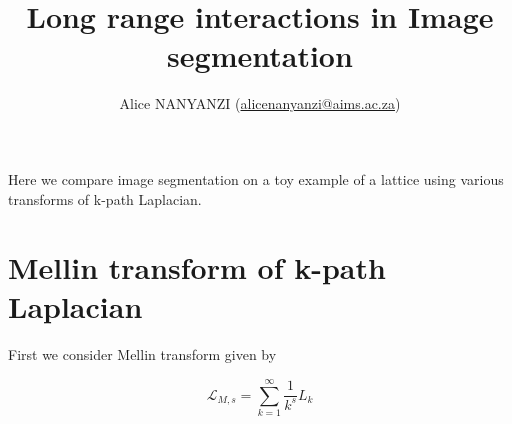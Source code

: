 \documentclass[10pt,a4paper]{article}
\author{Alice NANYANZI (\href{mailto:alicenanyanzi@aims.ac.za}{alicenanyanzi@aims.ac.za})}
\title{Long range interactions in Image segmentation}
\begin{document}
\maketitle
Here we compare image segmentation on a toy example of a lattice using various transforms of k-path Laplacian. 

\section{Mellin transform of k-path Laplacian}
First we consider Mellin transform given by

\begin{equation*}
\mathcal{L}_{M,s} = \sum_{k=1}^{\infty}\frac{1}{k^s} L_k
\end{equation*}
\end{document}
